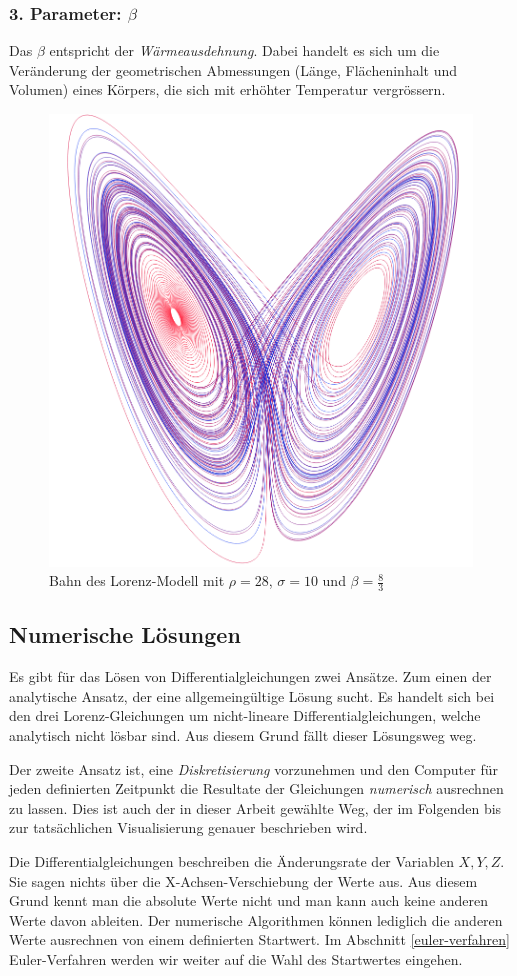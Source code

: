 \subsubsection{3. Parameter: $\beta$}
Das $ \beta $ entspricht der \textit{Wärmeausdehnung}. Dabei handelt es sich um die Veränderung der geometrischen Abmessungen (Länge, Flächeninhalt und Volumen) eines Körpers, die sich mit erhöhter Temperatur vergrössern.

\begin{figure}
	\centering
	\includegraphics[width=0.3\linewidth]{lorenz/assets/lorenz-modell/lorenz-modell}
	\caption{Bahn des Lorenz-Modell mit $\rho = 28$, $\sigma = 10$ und $\beta = \frac{8}{3}$}
	\label{fig:lorenz-modell}
\end{figure}


\subsection{Numerische Lösungen}
Es gibt für das Lösen von Differentialgleichungen zwei Ansätze. Zum einen der analytische Ansatz, der eine allgemeingültige Lösung sucht. Es handelt sich bei den drei Lorenz-Gleichungen um nicht-lineare Differentialgleichungen, welche analytisch nicht lösbar sind. Aus diesem Grund fällt dieser Lösungsweg weg. 

Der zweite Ansatz ist, eine \textit{Diskretisierung} vorzunehmen und den Computer für jeden definierten Zeitpunkt die Resultate der Gleichungen \textit{numerisch} ausrechnen zu lassen. Dies ist auch der in dieser Arbeit gewählte Weg, der im Folgenden bis zur tatsächlichen Visualisierung genauer beschrieben wird.

Die Differentialgleichungen beschreiben die Änderungsrate der Variablen $ X, Y, Z $. Sie sagen nichts über die X-Achsen-Verschiebung der Werte aus. Aus diesem Grund kennt man die absolute Werte nicht und man kann auch keine anderen Werte davon ableiten. Der numerische Algorithmen können lediglich die anderen Werte ausrechnen von einem definierten Startwert. Im Abschnitt \ref{euler-verfahren} Euler-Verfahren werden wir weiter auf die Wahl des Startwertes eingehen.

